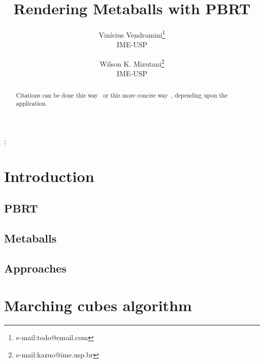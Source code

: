 \documentclass[conference]{acmsiggraph}
\title{Rendering Metaballs with PBRT}
\author{Vinícius Vendramini\thanks{e-mail:todo@email.com}\\IME-USP \and Wilson K. Mizutani\thanks{e-mail:kazuo@ime.usp.br}\\IME-USP}
\begin{document}

\maketitle

\begin{abstract}

Citations can be done this way~\cite{Jobs95} or this more concise 
way~, depending upon the application.

\end{abstract}

\begin{CRcatlist}
  ;
\end{CRcatlist}

\keywordlist


\TOGlinkslist


\copyrightspace

\section{Introduction}

\subsection{PBRT}

\subsection{Metaballs}

\subsection{Approaches}

\section{Marching cubes algorithm}
\end{document}
